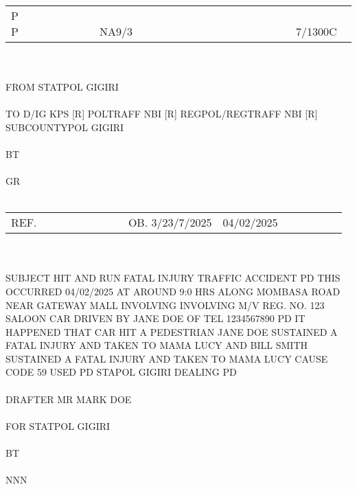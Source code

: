 \documentclass{article}\usepackage[]{graphicx}\usepackage[]{xcolor}
\begin{document}
\noindent \\
\begin{tabular}{@{}lcr} %
P    P & ~~~~~~~~~~~~~~~~~~~~~~~ NA9/3 & ~~~~~~~~~~~~~~~~~~ 7/1300C ~ \\
\end{tabular}
\\
\\
FROM STATPOL GIGIRI  \\
\\
TO D/IG KPS [R] POLTRAFF NBI [R] REGPOL/REGTRAFF NBI [R] SUBCOUNTYPOL GIGIRI \\
\\
BT \\
\\
GR  \\
\\
\begin{tabularx}{\textwidth}{@{}lXr} %
REF. & ~~~~~~~~~~~~~~ OB. 3/23/7/2025 & 04/02/2025 ~~~~~~~~~~ \\
\end{tabularx}
\\
\\
SUBJECT HIT AND RUN FATAL INJURY TRAFFIC ACCIDENT PD THIS OCCURRED 04/02/2025 AT AROUND 9:0  HRS ALONG MOMBASA ROAD NEAR GATEWAY MALL INVOLVING INVOLVING M/V REG. NO. 123 SALOON CAR DRIVEN BY JANE DOE OF TEL 1234567890 PD IT HAPPENED THAT CAR HIT A PEDESTRIAN JANE DOE SUSTAINED A FATAL INJURY AND TAKEN TO MAMA LUCY AND BILL SMITH SUSTAINED A FATAL INJURY AND TAKEN TO MAMA LUCY  CAUSE CODE 59 USED PD STAPOL GIGIRI DEALING PD \\
\\
DRAFTER MR MARK DOE \\
\\
FOR STATPOL GIGIRI \\
\\
BT  \\
\\
NNN  \\

\newpage
\end{document}
